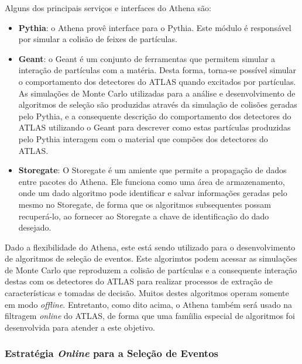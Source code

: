 Alguns dos principais serviços e interfaces do Athena são:

\begin{itemize}

\item \textbf{Pythia}: o Athena provê interface para o Pythia. Este módulo é responsável por simular a colisão de feixes de partículas. 

\item \textbf{Geant}: o Geant é um conjunto de ferramentas que permitem simular a interação de partículas com a matéria. Desta forma, torna-se possível simular o comportamento dos detectores do ATLAS quando excitados por partículas. As simulações de Monte Carlo utilizadas para a análise e desenvolvimento de algoritmos de seleção são produzidas através da simulação de colisões geradas pelo Pythia, e a consequente descrição do comportamento dos detectores do ATLAS utilizando o Geant para descrever como estas partículas produzidas pelo Pythia interagem  com o material que compões dos detectores do ATLAS.  

\item \textbf{Storegate}: O Storegate é um amiente que permite a propagação de dados entre pacotes do Athena. Ele funciona como uma área de armazenamento, onde um dado algoritmo pode identificar e salvar informações geradas pelo mesmo no Storegate, de forma que os algoritmos subsequentes possam recuperá-lo, ao fornecer ao Storegate a chave de identificação do dado desejado.

\end{itemize}


Dado a flexibilidade do Athena, este está sendo utilizado para o desenvolvimento de algoritmos de seleção de eventos. Este algorimtos podem acessar as simulações de Monte Carlo que reproduzem a colisão de partículas e a consequente interação destas com os detectores do ATLAS para realizar processos de extração de características e tomadas de decisão. Muitos destes algoritmos  operam somente em modo \emph{offline}. Entretanto, como dito acima, o Athena também será usado na filtragem \emph{online} do ATLAS, de forma que uma famíilia especial de algoritmos foi desenvolvida para atender a este objetivo.

\subsubsection{Estratégia \emph{Online} para a Seleção de Eventos}

